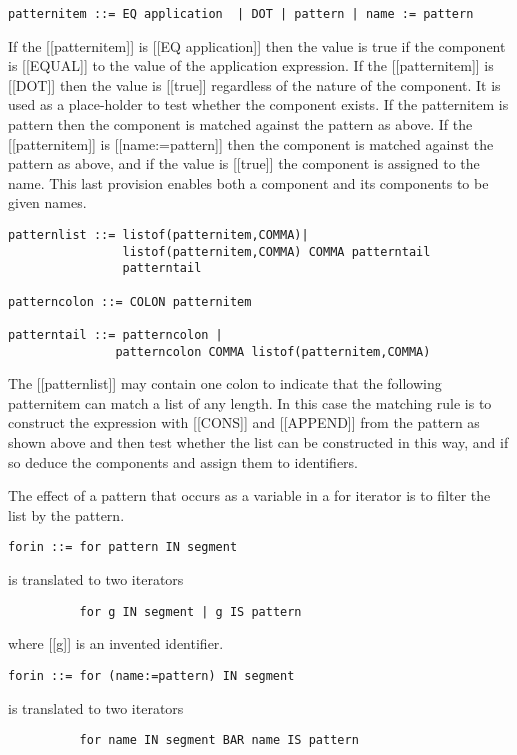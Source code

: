 \documentclass{article}
\begin{document}
\begin{verbatim} 
patternitem ::= EQ application  | DOT | pattern | name := pattern
\end{verbatim} 

If the [[patternitem]] is [[EQ application]] then the value is true if
the component is [[EQUAL]] to the value of the application expression.
If the [[patternitem]] is [[DOT]] then the value is [[true]] regardless of the
nature of the component.  It is used as a place-holder to test
whether the component exists.
If the patternitem is pattern then the component is matched against
the pattern as above.
If the [[patternitem]] is [[name:=pattern]] then the component is 
matched against 
the pattern as above, and if the value is [[true]] the component is assigned
to the name.  This last provision enables both a component and
its components to be given names.
\begin{verbatim}  
patternlist ::= listof(patternitem,COMMA)|
                listof(patternitem,COMMA) COMMA patterntail
                patterntail
 
patterncolon ::= COLON patternitem
 
patterntail ::= patterncolon |
               patterncolon COMMA listof(patternitem,COMMA)
\end{verbatim} 

The [[patternlist]] may contain one colon to indicate that the following
patternitem can match a list of any length. In this case
the matching rule is to construct the expression
with [[CONS]] and [[APPEND]] from the pattern as shown above and then test
whether the list can be constructed in this way, and if so
deduce the components and assign them to identifiers.
 
The effect of a pattern that occurs as a variable in a for iterator
is to filter the list by the pattern.
\begin{verbatim}  
forin ::= for pattern IN segment
\end{verbatim} 

is translated to two iterators
\begin{verbatim} 
          for g IN segment | g IS pattern
\end{verbatim} 
where [[g]] is an invented identifier.
\begin{verbatim} 
forin ::= for (name:=pattern) IN segment
\end{verbatim} 

is translated to two iterators
\begin{verbatim} 
          for name IN segment BAR name IS pattern
\end{verbatim} 
\end{document}
